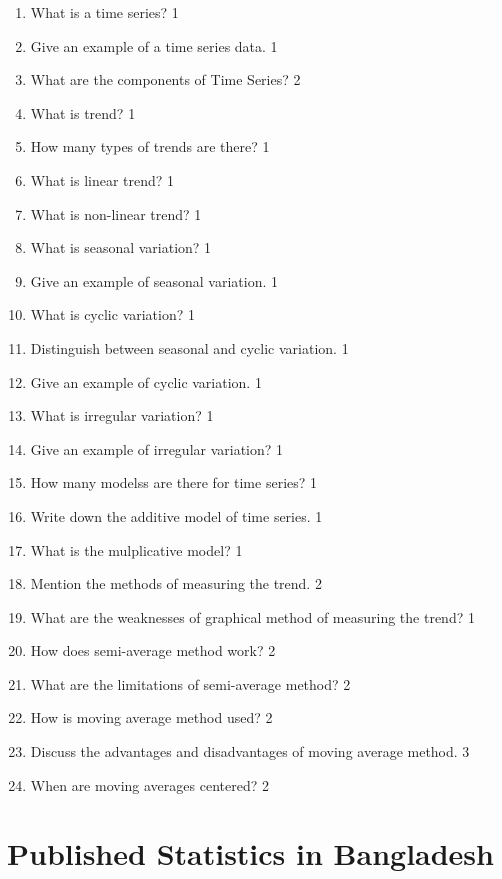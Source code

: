 \documentclass[a4paper,oneside]{book}
\begin{document}
\begin{enumerate}
  \begin{enumerate}
    \item What is a time series? \hfill 1
    \item Give an example of a time series data. \hfill 1
    \item What are the components of Time Series?   \hfill 2
    \item What is trend?  \hfill 1
    \item How many types of trends are there? \hfill 1
    \item What is linear trend?  \hfill 1
    \item What is non-linear trend? \hfill 1
    \item What is seasonal variation? \hfill 1
    \item Give an example of seasonal variation. \hfill 1
    \item What is cyclic variation?  \hfill 1
    \item Distinguish between seasonal and cyclic variation. \hfill 1
    \item Give an example of cyclic variation. \hfill 1
    \item What is irregular variation? \hfill 1
    \item Give an example of irregular variation? \hfill 1
    \item How many modelss are there for time series? \hfill 1
    \item Write down the additive model of time series. \hfill 1
    \item What is the mulplicative model? \hfill 1
    \item Mention the methods of measuring the trend. \hfill 2
    \item What are the weaknesses of graphical method of measuring the trend? \hfill 1
    \item How does semi-average method work? \hfill 2
    \item What are the limitations of semi-average method? \hfill 2
    \item How is moving average method used?  \hfill 2
    \item Discuss the advantages and disadvantages of moving average method. \hfill 3
    \item When are moving averages centered? \hfill 2
    
     \end{enumerate}

\chapter{Published Statistics in Bangladesh} 

\end{enumerate}
\end{document}
